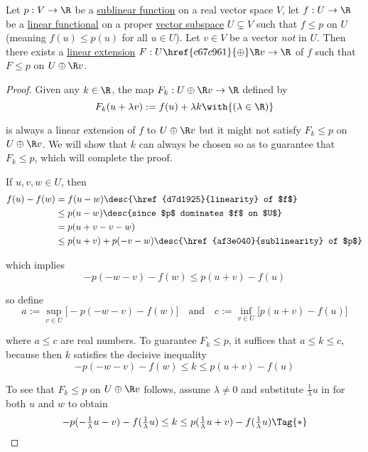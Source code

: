\label{cb1fa48}

Let $p:V\to\R$ be a \href{af3e040}{sublinear function} on a real vector space
$V$, let $f:U\to\R$ be a \href{b0b1db8}{linear functional} on a proper
\href{a0f0f06}{vector subspace} $U\subsetneq V$ such that $f\leq p$ on $U$
(meaning $f(u)\leq p(u)$ for all $u\in U$). Let $v\in V$ be a vector
\textit{not} in $U$. Then there exists a \href{c4fd746}{linear extension}
$F:U\href{c67c961}{\oplus}\R v\to\R$ of $f$ such that $F\leq p$ on $U\oplus\R
v$.

\begin{proof}
  \def\U{U\oplus\R v}
  Given any $k\in\R$, the map $F_k:\U\to\R$ defined by
  $$
    F_k(u+\lambda v):=f(u)+\lambda k\with{(\lambda\in\R)}
  $$

  is always a linear extension of $f$ to $\U$ but it might not satisfy $F_k\leq
  p$ on $\U$. We will show that $k$ can always be chosen so as to guarantee
  that $F_k\leq p$, which will complete the proof.

  If $u,v,w\in U$, then
  \begin{align*}
    f(u)-f(w) &=f(u-w)\desc{\href{d7d1925}{linearity} of $f$}                \\
              &\leq p(u-w)\desc{since $p$ dominates $f$ on $U$}              \\
              &=p(u+v-v-w)                                                   \\
              &\leq p(u+v)+p(-v-w)\desc{\href{af3e040}{sublinearity} of $p$}
  \end{align*}

  which implies
  $$
    -p(-w-v)-f(w)\leq p(u+v)-f(u)
  $$

  so define
  $$
    a:=\sup_{v\in U}\bigl[-p(-w-v)-f(w)\bigr]\quad\text{and}\quad
    c:=\inf_{v\in U}\bigl[p(u+v)-f(u)\bigr]
  $$

  where $a\leq c$ are real numbers. To guarantee $F_k\leq p$, it suffices that
  $a\leq k\leq c$, because then $k$ satisfies the decisive inequality
  $$
    -p(-w-v)-f(w)\leq k\leq p(u+v)-f(u)
  $$

  To see that $F_k\leq p$ on $\U$ follows, assume $\lambda\neq0$ and substitute
  $\frac1\lambda u$ in for both $u$ and $w$ to obtain
  \begin{equation*}
    -p(-\tfrac1\lambda u-v)-f(\tfrac1\lambda u)\leq k\leq p(\tfrac1\lambda u+v)-f(\tfrac1\lambda u)\Tag{*}
  \end{equation*}


\end{proof}
